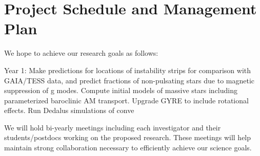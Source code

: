 \section{Project Schedule and Management Plan}

We hope to achieve our research goals as follows:

Year 1: Make predictions for locations of instability strips for comparison with GAIA/TESS data, and predict fractions of non-pulsating stars due to magnetic suppression of g modes. Compute initial models of massive stars including parameterized baroclinic AM transport. Upgrade GYRE to include rotational effects. Run Dedalus simulations of conve

We will  hold bi-yearly meetings including each investigator and their students/postdocs working on the proposed research. These meetings will help maintain strong collaboration necessary to efficiently achieve our science goals.
